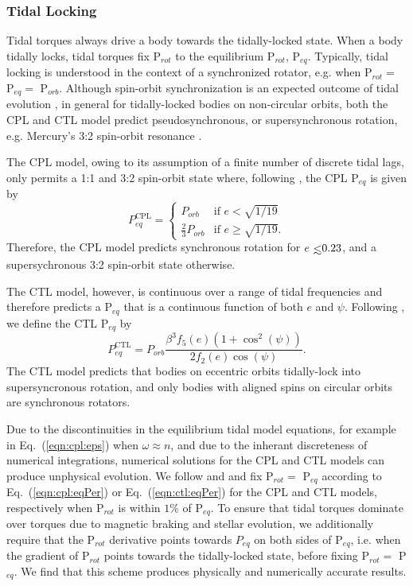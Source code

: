 \documentclass[twocolumn]{aastex61}
\def\lsim{~\rlap{$<$}{\lower 1.0ex\hbox{$\sim$}}}
\begin{document}
\subsubsection{Tidal Locking}

Tidal torques always drive a body towards the tidally-locked state. When a body tidally locks, tidal torques fix P$_{rot}$ to the equilibrium P$_{rot}$, P$_{eq}$.  Typically, tidal locking is understood in the context of a synchronized rotator, e.g. when P$_{rot} = $ P$_{eq} = $ P$_{orb}$. Although spin-orbit synchronization is an expected outcome of tidal evolution \citep{Counselman1973}, in general for tidally-locked bodies on non-circular orbits, both the CPL and CTL model predict pseudosynchronous, or supersynchronous rotation, e.g. Mercury's 3:2 spin-orbit resonance \citep[P$_{rot} = 2/3$ P$_{orb}$,][]{GoldreichPeale1966}.   

The CPL model, owing to its assumption of a finite number of discrete tidal lags, only permits a 1:1 and 3:2 spin-orbit state where, following \citet{Barnes2017}, the CPL P$_{eq}$ is given by
\begin{equation} \label{eqn:cpl:eqPer}
P^{\mathrm{CPL}}_{eq} = 
\begin{cases}
P_{orb} & \text{if } e < \sqrt{1/19}\\
\frac{2}{3}P_{orb} & \text{if } e \geq \sqrt{1/19}.
\end{cases}
\end{equation}
Therefore, the CPL model predicts synchronous rotation for $e \lsim 0.23$, and a supersychronous 3:2 spin-orbit state otherwise.

The CTL model, however, is continuous over a range of tidal frequencies and therefore predicts a P$_{eq}$ that is a continuous function of both $e$ and $\psi$.  Following \citet{Barnes2017}, we define the CTL P$_{eq}$ by
\begin{equation} \label{eqn:ctl:eqPer}
P^{\mathrm{CTL}}_{eq} = P_{orb} \frac{\beta^3 f_5(e) (1 + \cos^2(\psi))}{2f_2(e) \cos(\psi)}.
\end{equation}
The CTL model predicts that bodies on eccentric orbits tidally-lock into supersyncronous rotation, and only bodies with aligned spins on circular orbits are synchronous rotators. 

Due to the discontinuities in the equilibrium tidal model equations, for example in Eq.~(\ref{eqn:cpl:eps}) when $\omega \approx n$, and due to the inherant discreteness of numerical integrations, numerical solutions for the CPL and CTL models can produce unphysical evolution. We follow \citet{Barnes2013} and \citet{Fleming2018} and fix P$_{rot} = $ P$_{eq}$ according to Eq.~(\ref{eqn:cpl:eqPer}) or Eq.~(\ref{eqn:ctl:eqPer}) for the CPL and CTL models, respectively when P$_{rot}$ is within $1\%$ of P$_{eq}$.  To ensure that tidal torques dominate over torques due to magnetic braking and stellar evolution, we additionally require that the P$_{rot}$ derivative points towards $P_{eq}$ on both sides of P$_{eq}$, i.e. when the gradient of P$_{rot}$ points towards the tidally-locked state, before fixing P$_{rot} = $ P$_{eq}$. We find that this scheme produces physically and numerically accurate results. 
\end{document}
